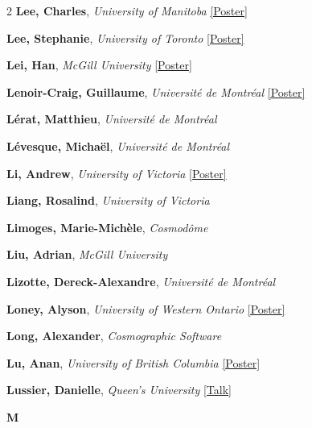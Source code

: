 \begin{small}
\begin{multicols}{2}
\textbf{Lee, Charles}, {\footnotesize\textit{University of Manitoba}} \hyperref[poster-abstract-page-talk-263]{\scriptsize\textcolor{cascateal}{[Poster]}}\par
\textbf{Lee, Stephanie}, {\footnotesize\textit{University of Toronto}} \hyperref[poster-abstract-page-talk-309]{\scriptsize\textcolor{cascateal}{[Poster]}}\par
\textbf{Lei, Han}, {\footnotesize\textit{McGill University}} \hyperref[poster-abstract-page-talk-189]{\scriptsize\textcolor{cascateal}{[Poster]}}\par
\textbf{Lenoir-Craig, Guillaume}, {\footnotesize\textit{Université de Montréal}} \hyperref[poster-abstract-page-talk-308]{\scriptsize\textcolor{cascateal}{[Poster]}}\par
\textbf{Lérat, Matthieu}, {\footnotesize\textit{Université de Montréal}}\par
\textbf{Lévesque, Michaël}, {\footnotesize\textit{Université de Montréal}}\par
\textbf{Li, Andrew}, {\footnotesize\textit{University of Victoria}} \hyperref[poster-abstract-page-talk-338]{\scriptsize\textcolor{cascateal}{[Poster]}}\par
\textbf{Liang, Rosalind}, {\footnotesize\textit{University of Victoria}}\par
\textbf{Limoges, Marie-Michèle}, {\footnotesize\textit{Cosmodôme}}\par
\textbf{Liu, Adrian}, {\footnotesize\textit{McGill University}}\par
\textbf{Lizotte, Dereck-Alexandre}, {\footnotesize\textit{Université de Montréal}}\par
\textbf{Loney, Alyson}, {\footnotesize\textit{University of Western Ontario}} \hyperref[poster-abstract-page-talk-179]{\scriptsize\textcolor{cascateal}{[Poster]}}\par
\textbf{Long, Alexander}, {\footnotesize\textit{Cosmographic Software}}\par
\textbf{Lu, Anan}, {\footnotesize\textit{University of British Columbia}} \hyperref[poster-abstract-page-talk-122]{\scriptsize\textcolor{cascateal}{[Poster]}}\par
\textbf{Lussier, Danielle}, {\footnotesize\textit{Queen's University}} \hyperref[abstract-page-talk-55]{\scriptsize\textcolor{cascablue}{[Talk]}}\par

{\sffamily\bfseries\color{cascablue}\large M}\\[2pt]


\end{multicols}
\end{small}
